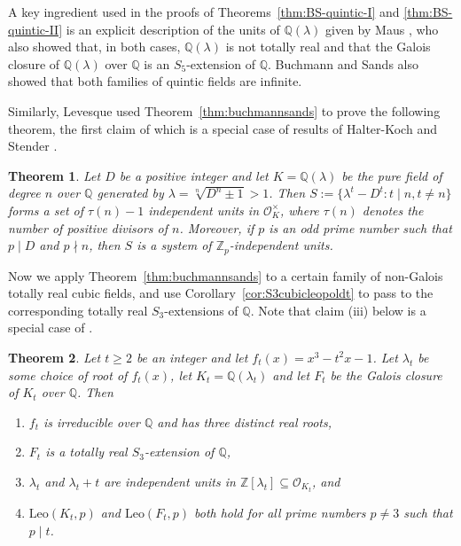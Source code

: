 \documentclass[12pt]{amsart}
\theoremstyle{plain}
\newtheorem{theorem}{Theorem}[section]
\theoremstyle{remark}
\theoremstyle{definition}
\newcommand{\Z}{\mathbb{Z}}
\newcommand{\Q}{\mathbb{Q}}
\newcommand{\Leo}{\mathrm{Leo}}
\numberwithin{equation}{section}
\begin{document}
A key ingredient used in the proofs of Theorems~\ref{thm:BS-quintic-I} and \ref{thm:BS-quintic-II}
is an explicit description of the units of $\Q(\lambda)$ given by Maus \cite[$\S$5 and $\S$6]{MR780251},
who also showed that, in both cases, $\Q(\lambda)$ is not totally real and that the Galois closure of $\Q(\lambda)$ over $\Q$ is an $S_{5}$-extension of $\Q$. 
Buchmann and Sands also showed that both families of quintic fields are infinite.

Similarly, Levesque \cite{MR1193191} used Theorem~\ref{thm:buchmannsands}
to prove the following theorem,
the first claim of which is a special case of results of Halter-Koch and Stender \cite{MR0364177}.

\begin{theorem}\cite{MR0364177, MR1193191}
Let $D$ be a positive integer and let $K=\Q(\lambda)$ be the pure field of degree $n$ over $\Q$
generated by $\lambda = \sqrt[n]{D^{n} \pm 1}>1$. 
Then $S := \{\lambda^{t}-D^{t} : t\mid n, t\neq n\}$ forms a set of $\tau(n)-1$ independent units in 
$\mathcal{O}_{K}^\times$, where $\tau(n)$ denotes the number of positive divisors of $n$.
Moreover, if $p$ is an odd prime number such that $p \mid D$ and $p \nmid n$, then
$S$ is a system of $\Z_{p}$-independent units.
\end{theorem}

Now we apply Theorem~\ref{thm:buchmannsands} to a certain family of non-Galois totally real cubic fields,
and use Corollary~\ref{cor:S3cubicleopoldt} to pass 
to the corresponding totally real $S_{3}$-extensions
of $\Q$. Note that claim (iii) below is a special case of \cite[Theorem in Appendix]{MR246851}.

\begin{theorem}\label{thm:S3-family-I}
Let $t \geq 2$ be an integer and let $f_{t}(x) = x^{3}-t^{2}x-1$.
Let $\lambda_{t}$ be some choice of root of $f_{t}(x)$, let $K_{t}=\Q(\lambda_{t})$ and let
$F_{t}$ be the Galois closure of $K_{t}$ over $\Q$. 
Then 
\begin{enumerate}
\item $f_{t}$ is irreducible over $\Q$ and has three distinct real roots,
\item $F_{t}$ is a totally real $S_{3}$-extension of $\Q$,
\item $\lambda_{t}$ and $\lambda_{t}+t$ are independent units in
$\Z[\lambda_{t}] \subseteq \mathcal{O}_{K_{t}}$, and
\item $\Leo(K_{t},p)$ and $\Leo(F_{t},p)$ both hold for all prime numbers $p \neq 3$ such that $p \mid t$.
\end{enumerate}
\end{theorem}
\end{document}
